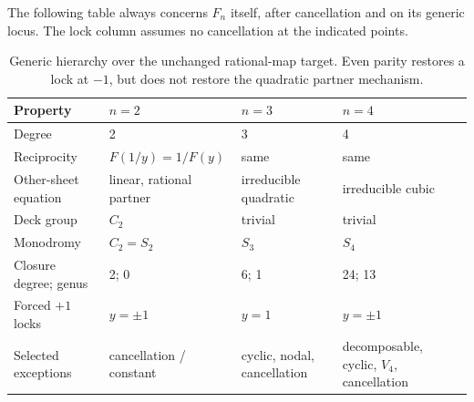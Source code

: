 The following table always concerns \(F_n\) itself, after cancellation and on its generic locus. The lock column assumes no cancellation at the indicated points.
\begin{table}[htbp]\centering\small
\begin{tabularx}{\linewidth}{L{.25\linewidth}YYY}\toprule
Property & \(n=2\) & \(n=3\) & \(n=4\)\\\midrule
Degree & 2 & 3 & 4\\
Reciprocity & \(F(1/y)=1/F(y)\) & same & same\\
Other-sheet equation & linear, rational partner & irreducible quadratic & irreducible cubic\\
Deck group & \(C_2\) & trivial & trivial\\
Monodromy & \(C_2=S_2\) & \(S_3\) & \(S_4\)\\
Closure degree; genus & 2; 0 & 6; 1 & 24; 13\\
Forced \(+1\) locks & \(y=\pm1\) & \(y=1\) & \(y=\pm1\)\\
Selected exceptions & cancellation / constant & cyclic, nodal, cancellation & decomposable, cyclic, \(V_4\), cancellation\\\bottomrule
\end{tabularx}
\caption{Generic hierarchy over the unchanged rational-map target. Even parity restores a lock at \(-1\), but does not restore the quadratic partner mechanism.}\label{tab:hierarchy}
\end{table}
